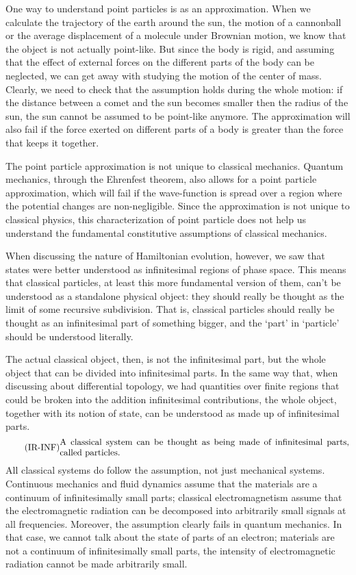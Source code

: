 One way to understand point particles is as an approximation. When we calculate the trajectory of the earth around the sun, the motion of a cannonball or the average displacement of a molecule under Brownian motion, we know that the object is not actually point-like. But since the body is rigid, and assuming that the effect of external forces on the different parts of the body can be neglected, we can get away with studying the motion of the center of mass. Clearly, we need to check that the assumption holds during the whole motion: if the distance between a comet and the sun becomes smaller then the  radius of the sun, the sun cannot be assumed to be point-like anymore. The approximation will also fail if the force exerted on different parts of a body is greater than the force that keeps it together.

The point particle approximation is not unique to classical mechanics. Quantum mechanics, through the Ehrenfest theorem, also allows for a point particle approximation, which will fail if the wave-function is spread over a region where the potential changes are non-negligible. Since the approximation is not unique to classical physics, this characterization of point particle does not help us understand the fundamental constitutive assumptions of classical mechanics.

When discussing the nature of Hamiltonian evolution, however, we saw that states were better understood as infinitesimal regions of phase space. This means that classical particles, at least this more fundamental version of them, can't be understood as a standalone physical object: they should really be thought as the limit of some recursive subdivision. That is, classical particles should really be thought as an infinitesimal part of something bigger, and the `part' in `particle' should be understood literally.

The actual classical object, then, is not the infinitesimal part, but the whole object that can be divided into infinitesimal parts. In the same way that, when discussing about differential topology, we had quantities over finite regions that could be broken into the addition infinitesimal contributions, the whole object, together with its notion of state, can be understood as made up of infinitesimal parts.
\begin{equation}\tag{IR-INF}\label{rp-cm-ir-condMadeOfInfinitesimalParts}
	\eqtext{A classical system can be thought as being made of infinitesimal parts, called particles.}
\end{equation}
All classical systems do follow the assumption, not just mechanical systems. Continuous mechanics and fluid dynamics assume that the materials are a continuum of infinitesimally small parts; classical electromagnetism assume that the electromagnetic radiation can be decomposed into arbitrarily small signals at all frequencies. Moreover, the assumption clearly fails in quantum mechanics. In that case, we cannot talk about the state of parts of an electron; materials are not a continuum of infinitesimally small parts, the intensity of electromagnetic radiation cannot be made arbitrarily small.

